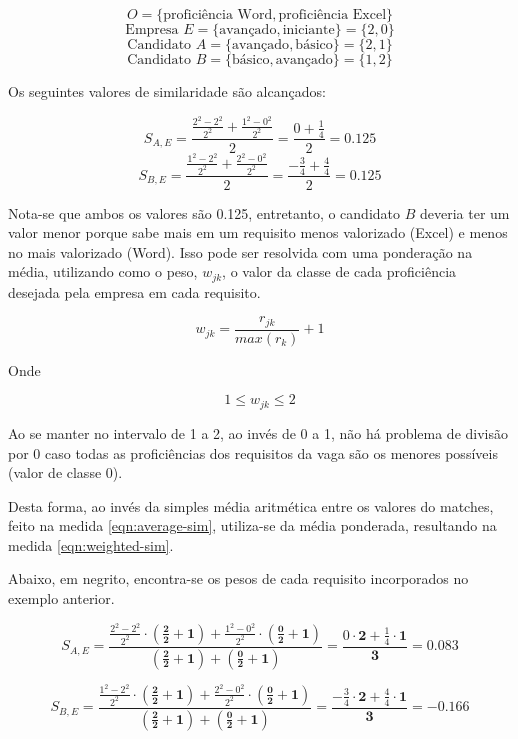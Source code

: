 \documentclass[preprint,12pt]{elsarticle}
\begin{document}
$$ O = \{ \text{proficiência Word}, \text{proficiência Excel} \} $$
$$ \text{Empresa } E = \{ \text{avançado}, \text{iniciante} \} = \{ 2, 0 \} $$
$$ \text{Candidato } A = \{ \text{avançado}, \text{básico} \} = \{ 2, 1 \} $$
$$ \text{Candidato } B = \{ \text{básico}, \text{avançado} \} = \{ 1, 2 \} $$

Os seguintes valores de similaridade são alcançados:

$$ S_{A,E} = \frac{\tfrac{2^2 - 2^2}{2^2} + \tfrac{1^2 - 0^2}{2^2}}{2} = \frac{0 + \tfrac{1}{4}}{2} =  0.125 $$
$$ S_{B,E} = \frac{\tfrac{1^2 - 2^2}{2^2} + \tfrac{2^2 - 0^2}{2^2}}{2} = \frac{-\tfrac{3}{4} + \tfrac{4}{4}}{2} = 0.125 $$

Nota-se que ambos os valores são 0.125, entretanto, o candidato $B$ deveria ter um valor menor porque sabe mais em um requisito menos valorizado (Excel) e menos no mais valorizado (Word). Isso pode ser resolvida com uma ponderação na média, utilizando como o peso, $w_{jk}$, o valor da classe de cada proficiência desejada pela empresa em cada requisito. 

\begin{equation}
\label{eqn:weight}
    w_{jk} = \frac{r_{jk}}{max(r_k)} + 1
\end{equation}

Onde

\begin{equation}
1 \leq w_{jk} \leq 2
\end{equation}

Ao se manter no intervalo de 1 a 2, ao invés de 0 a 1, não há problema de divisão por 0 caso todas as proficiências dos requisitos da vaga são os menores possíveis (valor de classe 0).

Desta forma, ao invés da simples média aritmética entre os valores do matches, feito na medida \ref{eqn:average-sim}, utiliza-se da média ponderada, resultando na medida \ref{eqn:weighted-sim}. 

Abaixo, em negrito, encontra-se os pesos de cada requisito incorporados no exemplo anterior.

$$ S_{A,E} = \frac{\tfrac{2^2 - 2^2}{2^2} \cdot \boldsymbol{(\tfrac{2}{2} + 1)} + \tfrac{1^2 - 0^2}{2^2} \cdot \boldsymbol{(\tfrac{0}{2} + 1)}}{\boldsymbol{(\tfrac{2}{2} + 1)} + \boldsymbol{(\tfrac{0}{2} + 1)}} = \frac{0 \cdot \textbf{2} + \tfrac{1}{4} \cdot \textbf{1}}{\textbf{3}} = 0.083 $$

$$ S_{B,E} = \frac{\tfrac{1^2 - 2^2}{2^2} \cdot \boldsymbol{(\tfrac{2}{2} + 1)} + \tfrac{2^2 - 0^2}{2^2} \cdot \boldsymbol{(\tfrac{0}{2} + 1)}}{\boldsymbol{(\tfrac{2}{2} + 1)} + \boldsymbol{(\tfrac{0}{2} + 1)}} = \frac{-\tfrac{3}{4} \cdot \textbf{2} + \tfrac{4}{4} \cdot \textbf{1}}{\textbf{3}} = -0.166 $$
\end{document}
